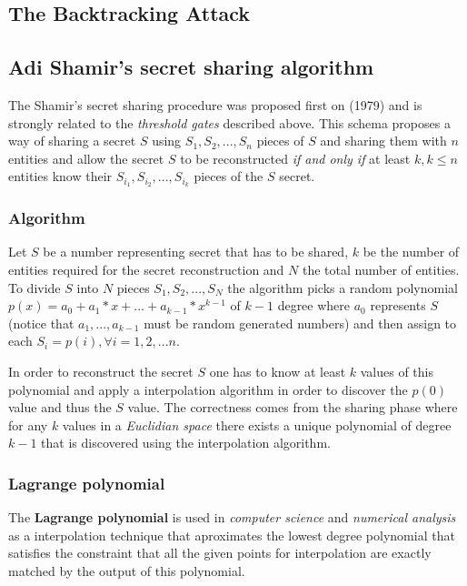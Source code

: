 \documentclass[12pt]{article}
\begin{document}
\subsection{The Backtracking Attack}



\subsection{Adi Shamir's secret sharing algorithm}

The Shamir's secret sharing procedure was proposed first on \cite{shamir}(1979) and is strongly related to the \textit{threshold gates} described above. This schema proposes a way of sharing a secret $S$ using $S_1, S_2, ..., S_n$ pieces of $S$ and sharing them with $n$ entities and allow the secret $S$ to be reconstructed \textit{if and only if} at least $k, k \le n$ entities know their $S_{i_1}, S_{i_2}, ..., S_{i_k}$ pieces of the $S$ secret. 

\subsubsection{Algorithm}

Let $S$ be a number representing secret that has to be shared, $k$ be the number of entities required for the secret reconstruction and $N$ the total number of entities. To divide $S$ into $N$ pieces $S_1, S_2, ..., S_N$ the algorithm picks a random polynomial $p(x) = a_0 + a_1 * x + ... + a_{k - 1} * x^{k - 1}$ of $k - 1$ degree where $a_0$ represents $S$ (notice that $a_1, ..., a_{k - 1}$ must be random generated numbers) and then assign to each $S_i = p(i), \forall i = {1, 2, ... n}$.

In order to reconstruct the secret $S$ one has to know at least $k$ values of this polynomial and apply a interpolation algorithm in order to discover the $p(0)$ value and thus the $S$ value. The correctness comes from the sharing phase where for any $k$ values in a \textit{Euclidian space} there exists a unique polynomial of degree $k - 1$ that is discovered using the interpolation algorithm.

\subsubsection{Lagrange polynomial}

The \textbf{Lagrange polynomial} is used in \textit{computer science} and \textit{numerical analysis} as a interpolation technique that aproximates the lowest degree polynomial that satisfies the constraint that all the given points for interpolation are exactly matched by the output of this polynomial.
\end{document}
